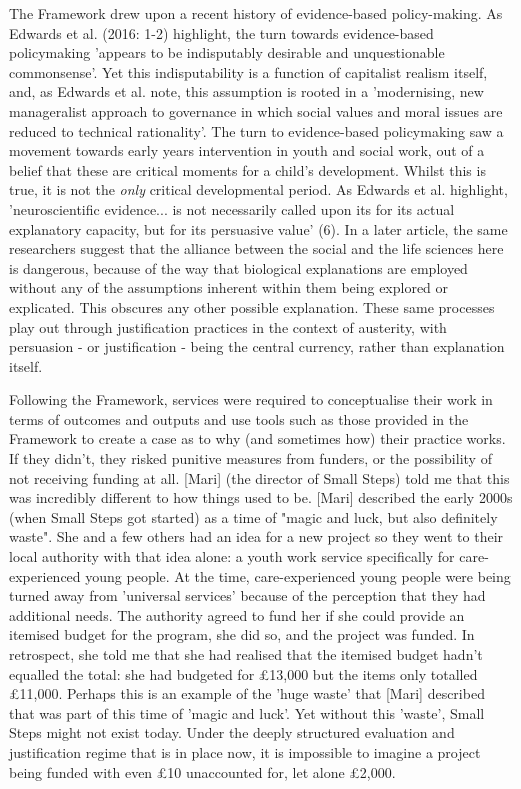 The Framework drew upon a recent history of evidence-based policy-making. As Edwards et al. (2016: 1-2) highlight, the turn towards evidence-based policymaking 'appears to be indisputably desirable and unquestionable commonsense'. Yet this indisputability is a function of capitalist realism itself, and, as Edwards et al. note, this assumption is rooted in a 'modernising, new manageralist approach to governance in which social values and moral issues are reduced to technical rationality'. The turn to evidence-based policymaking saw a movement towards early years intervention in youth and social work, out of a belief that these are critical moments for a child's development. Whilst this is true, it is not the \emph{only} critical developmental period. As Edwards et al. highlight, 'neuroscientific evidence... is not necessarily called upon its for its actual explanatory capacity, but for its persuasive value' (6). In a later article, the same researchers suggest that the alliance between the social and the life sciences here is dangerous, because of the way that biological explanations are employed without any of the assumptions inherent within them being explored or explicated. This obscures any other possible explanation. These same processes play out through justification practices in the context of austerity, with persuasion - or justification - being the central currency, rather than explanation itself. 

Following the Framework, services were required to conceptualise their work in terms of outcomes and outputs and use tools such as those provided in the Framework to create a case as to why (and sometimes how) their practice works. If they didn't, they risked punitive measures from funders, or the possibility of not receiving funding at all. [Mari] (the director of Small Steps) told me that this was incredibly different to how things used to be. [Mari] described the early 2000s (when Small Steps got started) as a time of "magic and luck, but also definitely waste". She and a few others had an idea for a new project so they went to their local authority with that idea alone: a youth work service specifically for care-experienced young people. At the time, care-experienced young people were being turned away from 'universal services' because of the perception that they had additional needs. The authority agreed to fund her if she could provide an itemised budget for the program, she did so, and the project was funded. In retrospect, she told me that she had realised that the itemised budget hadn't equalled the total: she had budgeted for £13,000 but the items only totalled £11,000. Perhaps this is an example of the 'huge waste' that [Mari] described that was part of this time of 'magic and luck'. Yet without this 'waste', Small Steps might not exist today. Under the deeply structured evaluation and justification regime that is in place now, it is impossible to imagine a project being funded with even £10 unaccounted for, let alone £2,000.

